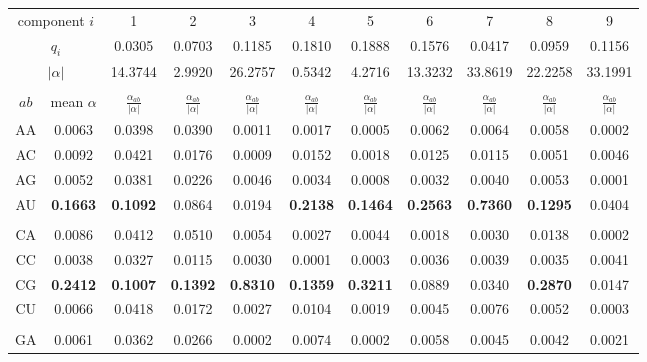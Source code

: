 \documentclass[11pt]{article}
\begin{document}
\begin{table}
\footnotesize
\begin{center}
\begin{tabular}{|c|c|c|c|c|c|c|c|c|c|c|} \hline
\multicolumn{2}{|c|}{component $i$} & 1 & 2 & 3 & 4 & 5 & 6 & 7 & 8 & 9 \\
\multicolumn{2}{|c|}{$q_i$} & 0.0305 & 0.0703 & 0.1185 & 0.1810 & 0.1888 & 0.1576 & 0.0417 & 0.0959 & 0.1156 \\
\multicolumn{2}{|c|}{$|\alpha|$} & 14.3744 & 2.9920 & 26.2757 & 0.5342 &
4.2716 & 13.3232 & 33.8619 & 22.2258 & 33.1991 \\ \hline 
\multicolumn{11}{c}{} \\ \hline

$ab$ & mean $\alpha$ & $\frac{\alpha_{ab}}{|\alpha|}$ & $\frac{\alpha_{ab}}{|\alpha|}$ & $\frac{\alpha_{ab}}{|\alpha|}$ & $\frac{\alpha_{ab}}{|\alpha|}$ & $\frac{\alpha_{ab}}{|\alpha|}$ & $\frac{\alpha_{ab}}{|\alpha|}$ & $\frac{\alpha_{ab}}{|\alpha|}$ & $\frac{\alpha_{ab}}{|\alpha|}$ & $\frac{\alpha_{ab}}{|\alpha|}$ \\ \hline 
AA & 0.0063 & 0.0398 & 0.0390 & 0.0011 & 0.0017 & 0.0005 & 0.0062 & 0.0064 & 0.0058 & 0.0002 \\  
AC & 0.0092 & 0.0421 & 0.0176 & 0.0009 & 0.0152 & 0.0018 & 0.0125 & 0.0115 & 0.0051 & 0.0046 \\  
AG & 0.0052 & 0.0381 & 0.0226 & 0.0046 & 0.0034 & 0.0008 & 0.0032 & 0.0040 & 0.0053 & 0.0001 \\  
AU & \textbf{0.1663} & \textbf{0.1092} & 0.0864 & 0.0194 & \textbf{0.2138} & \textbf{0.1464} & \textbf{0.2563} & \textbf{0.7360} & \textbf{0.1295} & 0.0404 \\  
& & & & & & & & & & \\
CA & 0.0086 & 0.0412 & 0.0510 & 0.0054 & 0.0027 & 0.0044 & 0.0018 & 0.0030 & 0.0138 & 0.0002 \\  
CC & 0.0038 & 0.0327 & 0.0115 & 0.0030 & 0.0001 & 0.0003 & 0.0036 & 0.0039 & 0.0035 & 0.0041 \\  
CG & \textbf{0.2412} & \textbf{0.1007} & \textbf{0.1392} & \textbf{0.8310} & \textbf{0.1359} & \textbf{0.3211} & 0.0889 & 0.0340 & \textbf{0.2870} & 0.0147 \\  
CU & 0.0066 & 0.0418 & 0.0172 & 0.0027 & 0.0104 & 0.0019 & 0.0045 & 0.0076 & 0.0052 & 0.0003 \\  
& & & & & & & & & & \\
GA & 0.0061 & 0.0362 & 0.0266 & 0.0002 & 0.0074 & 0.0002 & 0.0058 & 0.0045 & 0.0042 & 0.0021 \\  

\end{tabular}
\end{center}
\end{table}
\end{document}
